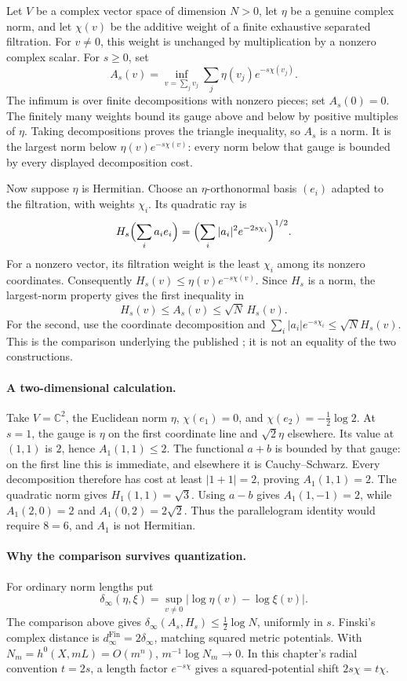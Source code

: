 Let \(V\) be a complex vector space of dimension \(N>0\), let
\(\eta\) be a genuine complex norm, and let \(\chi(v)\) be the
additive weight of a finite exhaustive separated filtration.
For \(v\ne0\), this weight is unchanged by multiplication by
a nonzero complex scalar. For \(s\ge0\), set
\[
 A_s(v)=\inf_{v=\sum_j v_j}
               \sum_j\eta(v_j)e^{-s\chi(v_j)}.
\]
The infimum is over finite decompositions with nonzero pieces;
set \(A_s(0)=0\). The finitely many weights bound its gauge
above and below by positive multiples of \(\eta\). Taking
decompositions proves the triangle inequality, so \(A_s\) is
a norm. It is the largest norm below
\(\eta(v)e^{-s\chi(v)}\): every norm below that gauge is
bounded by every displayed decomposition cost.

Now suppose \(\eta\) is Hermitian. Choose an \(\eta\)-orthonormal
basis \((e_i)\) adapted to the filtration, with weights
\(\chi_i\). Its quadratic ray is
\[
 H_s\Bigl(\sum_i a_i e_i\Bigr)
       =\Bigl(\sum_i|a_i|^2e^{-2s\chi_i}\Bigr)^{1/2}.
\]
For a nonzero vector, its filtration weight is the least
\(\chi_i\) among its nonzero coordinates. Consequently
\(H_s(v)\le\eta(v)e^{-s\chi(v)}\). Since \(H_s\) is a norm,
the largest-norm property gives the first inequality in
\[
             H_s(v)\le A_s(v)\le\sqrt N\,H_s(v).
\]
For the second, use the coordinate decomposition and
\(\sum_i|a_i|e^{-s\chi_i}\le\sqrt N H_s(v)\).
This is the comparison underlying the published
\cite[Lemma~2.6]{Finski25SubmultiplicativePublished}; it is
not an equality of the two constructions.

\paragraph{A two-dimensional calculation.}
Take \(V=\mathbb C^2\), the Euclidean norm \(\eta\),
\(\chi(e_1)=0\), and \(\chi(e_2)=-\tfrac12\log2\).
At \(s=1\), the gauge is \(\eta\) on the first coordinate
line and \(\sqrt2\eta\) elsewhere. Its value at \((1,1)\)
is \(2\), hence \(A_1(1,1)\le2\).
The functional \(a+b\) is bounded by that gauge: on the first
line this is immediate, and elsewhere it is Cauchy--Schwarz.
Every decomposition therefore has cost at least
\(|1+1|=2\), proving \(A_1(1,1)=2\).
The quadratic norm gives \(H_1(1,1)=\sqrt3\).
Using \(a-b\) gives \(A_1(1,-1)=2\), while
\(A_1(2,0)=2\) and \(A_1(0,2)=2\sqrt2\).
Thus the parallelogram identity would require \(8=6\),
and \(A_1\) is not Hermitian.

\paragraph{Why the comparison survives quantization.}
For ordinary norm lengths put
\[
 \delta_\infty(\eta,\xi)
       =\sup_{v\ne0}|\log\eta(v)-\log\xi(v)|.
\]
The comparison above gives
\(\delta_\infty(A_s,H_s)\le\tfrac12\log N\), uniformly
in \(s\). Finski's complex distance is
\(d_\infty^{\mathrm{Fin}}=2\delta_\infty\), matching
squared metric potentials. With \(N_m=h^0(X,mL)=O(m^n)\),
\(m^{-1}\log N_m\to0\). In this chapter's radial convention \(t=2s\),
a length factor \(e^{-s\chi}\) gives a squared-potential
shift \(2s\chi=t\chi\).

